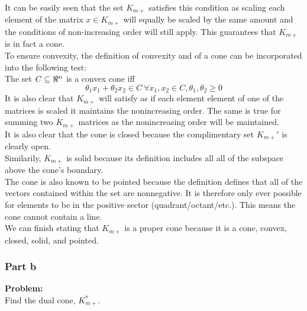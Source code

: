 \documentclass[letter]{article}
\begin{document}
It can be easily seen that the set $K_{m+}$ satisfies this condition as scaling each element of the matrix $x \in K_{m+}$ will equally be scaled by the same amount and the conditions of non-increasing order will still apply. This guarantees that $K_{m+}$ is in fact a cone.\\
To ensure convexity, the definition of convexity and of a cone can be incorporated into the following test:\\
The set $C \subseteq \real^n$ is a convex cone iff
\begin{equation}
	\theta_1 x_1 + \theta_2 x_2 \in C \ \forall x_1,x_2 \in C, \theta_1, \theta_2 \geq 0
\end{equation}
It is also clear that $K_{m+}$ will satisfy as if each element element of one of the matrices is scaled it maintains the nonincreasing order. The same is true for summing two $K_{m+}$ matrices as the nonincreasing order will be maintained.\\
It is also clear that the cone is closed because the complimentary set $K_{m+}'$ is clearly open.\\
Similarily, $K_{m+}$ is solid because its definition includes all all of the subspace above the cone's boundary.\\
The cone is also known to be pointed because the definition defines that all of the vectors contained within the set are nonnegative. It is therefore only ever possible for elements to be in the positive sector (quadrant/octant/etc.). This means the cone cannot contain a line.\\
We can finish stating that $K_{m+}$ is a proper cone because it is a cone, convex, closed, solid, and pointed.

\newpage
\subsubsection{Part b}
\textbf{Problem:}\\
Find the dual cone, $K_{m+}^*$.
\end{document}
